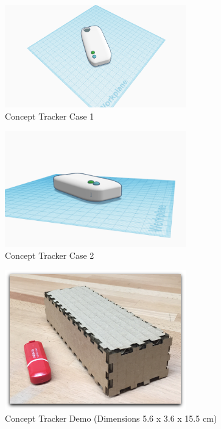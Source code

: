 \documentclass[12pt,a4paper]{article}
\begin{document}
        \begin{figure}[H]
          \centering
          \includegraphics[width=0.7\textwidth]{../assets/design-tracker-case-design-1.jpg}
          \caption{Concept Tracker Case 1}
          \label{fig:Concept Tracker Case 1}
        \end{figure}

        \begin{figure}[H]
          \centering
          \includegraphics[width=0.7\textwidth]{../assets/design-tracker-case-design-2.jpg}
          \caption{Concept Tracker Case 2}
          \label{fig:Concept Tracker Case 2}
        \end{figure}

        \begin{figure}[H]
          \centering
          \includegraphics[width=0.7\textwidth]{../assets/design-tracker-case-demo.jpg}
          \caption{Concept Tracker Demo (Dimensions 5.6 x 3.6 x 15.5 cm)}
          \label{fig:Concept Tracker Demo}
        \end{figure}
\end{document}
